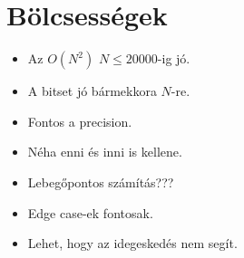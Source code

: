 \documentclass[12pt,english]{article}
\begin{document}
\section{Bölcsességek}

\begin{itemize}
    \item Az $O(N^2)$ $N\le 20 000$-ig jó.
    \item A bitset jó bármekkora $N$-re.
    \item Fontos a precision.
    \item Néha enni és inni is kellene.
    \item Lebegőpontos számítás???
    \item Edge case-ek fontosak.
    \item Lehet, hogy az idegeskedés nem segít.
\end{itemize}

\end{document}
